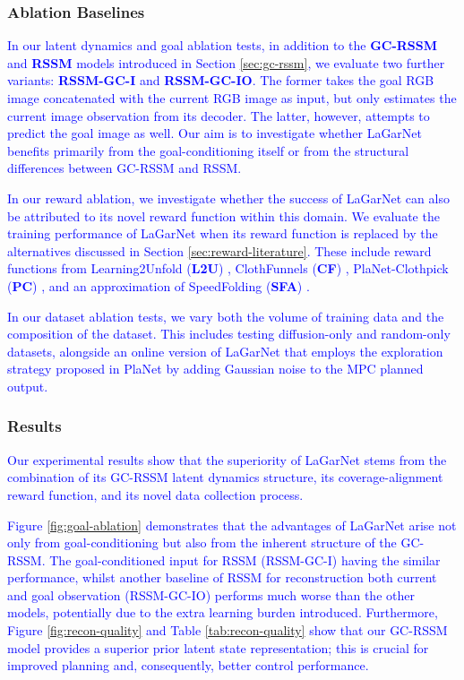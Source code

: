 \documentclass[journal]{IEEEtran}
\newcommand{\addadvantage}[1]{\textcolor{blue}{#1}}
\begin{document}
\subsubsection{Ablation Baselines}


\addadvantage{In our latent dynamics and goal ablation tests, in addition to the \textbf{GC-RSSM} and \textbf{RSSM} models introduced in Section \ref{sec:gc-rssm}, we evaluate two further variants: \textbf{RSSM-GC-I} and \textbf{RSSM-GC-IO}. The former takes the goal RGB image concatenated with the current RGB image as input, but only estimates the current image observation from its decoder. The latter, however, attempts to predict the goal image as well. Our aim is to investigate whether LaGarNet benefits primarily from the goal-conditioning itself or from the structural differences between GC-RSSM and RSSM.}

\addadvantage{In our reward ablation, we investigate whether the success of LaGarNet can also be attributed to its novel reward function within this domain. We evaluate the training performance of LaGarNet when its reward function is replaced by the alternatives discussed in Section \ref{sec:reward-literature}. These include reward functions from Learning2Unfold (\textbf{L2U}) \cite{gu2023learning}, ClothFunnels (\textbf{CF}) \cite{canberk2023cloth}, PlaNet-Clothpick (\textbf{PC}) \cite{kadi2024planet}, and an approximation of SpeedFolding (\textbf{SFA}) \cite{avigal2022speedfolding}.}

\addadvantage{In our dataset ablation tests, we vary both the volume of training data and the composition of the dataset. This includes testing diffusion-only and random-only datasets, alongside an online version of LaGarNet that employs the exploration strategy proposed in PlaNet \cite{hafner2019learning} by adding Gaussian noise to the MPC planned output.}
 
\subsubsection{Results}

\addadvantage{Our experimental results show that the superiority of LaGarNet stems from the combination of its GC-RSSM latent dynamics structure, its coverage-alignment reward function, and its novel data collection process. }

\addadvantage{Figure \ref{fig:goal-ablation} demonstrates that the advantages of LaGarNet arise not only from goal-conditioning but also from the inherent structure of the GC-RSSM. The goal-conditioned input for RSSM (RSSM-GC-I) having the similar performance, whilst another baseline of RSSM for reconstruction both current and goal observation (RSSM-GC-IO) performs much worse than the other models, potentially due to the extra learning burden introduced. Furthermore, Figure \ref{fig:recon-quality} and Table \ref{tab:recon-quality} show that our GC-RSSM model provides a superior prior latent state representation; this is crucial for improved planning and, consequently, better control performance.}
\end{document}
